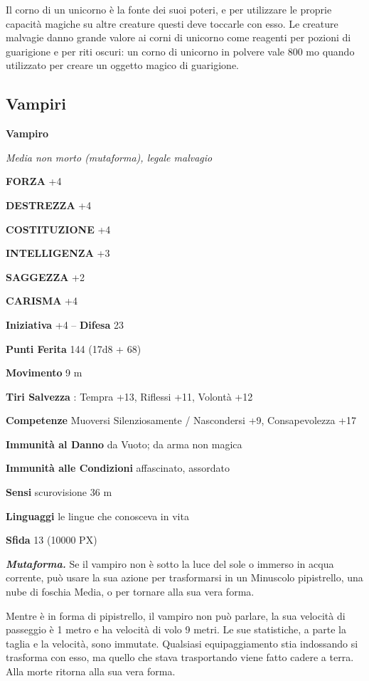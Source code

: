 \begin{multicols}{2}
Il corno di un unicorno è la fonte dei suoi poteri, e per utilizzare le proprie capacità magiche su altre creature questi deve toccarle con esso. Le creature malvagie danno grande valore ai corni di unicorno come reagenti per pozioni di guarigione e per riti oscuri: un corno di unicorno in polvere vale 800 mo quando utilizzato per creare un oggetto magico di guarigione.

\subsection{Vampiri}

\medskip{}\textbf{Vampiro}

\textit{Media non morto (mutaforma), legale malvagio}

\textbf{FORZA} +4

\textbf{DESTREZZA} +4

\textbf{COSTITUZIONE} +4

\textbf{INTELLIGENZA} +3

\textbf{SAGGEZZA} +2

\textbf{CARISMA} +4

\textbf{Iniziativa} +4 -- \textbf{Difesa} 23

\textbf{Punti Ferita} 144 (17d8 + 68)

\textbf{Movimento} 9 m

\textbf{Tiri Salvezza} : Tempra +13, Riflessi +11, Volontà +12

\textbf{Competenze} Muoversi Silenziosamente / Nascondersi +9, Consapevolezza +17

\textbf{Immunità al Danno} da Vuoto; da arma non magica

\textbf{Immunità alle Condizioni} affascinato, assordato

\textbf{Sensi} scurovisione 36 m

\textbf{Linguaggi} le lingue che conosceva in vita

\textbf{Sfida} 13 (10000 PX)

\textit{\textbf{Mutaforma.}} Se il vampiro non è sotto la luce del sole o immerso in acqua corrente, può usare la sua azione per trasformarsi in un Minuscolo pipistrello, una nube di foschia Media, o per tornare alla sua vera forma.

Mentre è in forma di pipistrello, il vampiro non può parlare, la sua velocità di passeggio è 1 metro e ha velocità di volo 9 metri. Le sue statistiche, a parte la taglia e la velocità, sono immutate. Qualsiasi equipaggiamento stia indossando si trasforma con esso, ma quello che stava trasportando viene fatto cadere a terra. Alla morte ritorna alla sua vera forma.


\end{multicols}
